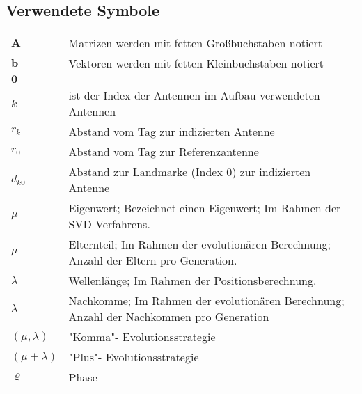 \newpage
\subsection*{Verwendete Symbole}
%
\begin{table} [H]
	\begin{center}
		\begin{tabular}{p{15mm}p{95mm}}
			$\mathbf{A}$ & Matrizen werden mit fetten Großbuchstaben notiert\\
			$\mathbf{b}$ & Vektoren werden mit fetten Kleinbuchstaben notiert\\
			$\mathbf{0}$ & \text{Nullvektor}\\
			$k$ & ist der Index der Antennen im Aufbau verwendeten Antennen\\
			$r_{k}$ & Abstand vom Tag zur indizierten Antenne\\
			$r_{0}$ & Abstand vom Tag zur Referenzantenne\\
			$d_{k0}$ & Abstand zur Landmarke (Index $0$) zur indizierten Antenne\\
			$\mu $ & Eigenwert; Bezeichnet einen Eigenwert; Im Rahmen der SVD-Verfahrens.\\
			$\mu $ & Elternteil; Im Rahmen der evolutionären Berechnung; Anzahl der Eltern pro Generation.\\
			$\lambda $ & Wellenlänge; Im Rahmen der Positionsberechnung.\\
			$\lambda $ & Nachkomme; Im Rahmen der evolutionären Berechnung; Anzahl der Nachkommen pro Generation\\
			$(\mu,\lambda)$ & "Komma"- Evolutionsstrategie \\
			$(\mu+\lambda)$ & "Plus"- Evolutionsstrategie \\
			$\varrho$ & Phase \\
%			
		\end{tabular}
	\end{center}
\end{table}

